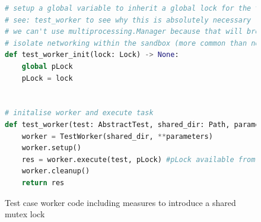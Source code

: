 \documentclass[hidelinks]{report}
\begin{document}
\begin{figure}[h]
	\centering
	\begin{lstlisting}[language=python, breaklines=true, linewidth=\linewidth, tabsize=4]
# setup a global variable to inherit a global lock for the test preprocessing
# see: test_worker to see why this is absolutely necessary
# we can't use multiprocessing.Manager because that will break if we
# isolate networking within the sandbox (more common than not)
def test_worker_init(lock: Lock) -> None:
    global pLock
    pLock = lock


# initalise worker and execute task
def test_worker(test: AbstractTest, shared_dir: Path, parameters) -> AbstractTest:
    worker = TestWorker(shared_dir, **parameters)
    worker.setup()
    res = worker.execute(test, pLock) #pLock available from Pool initializer (global var)
    worker.cleanup()
    return res
	\end{lstlisting}
	\caption{Test case worker code including measures to introduce a shared mutex lock}
	\label{fig:testSchedulerWorker}
\end{figure}
\end{document}
